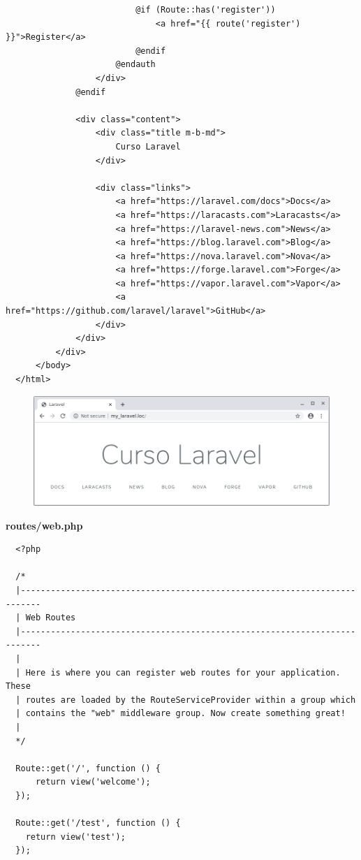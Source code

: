 \documentclass{article}
\begin{document}
\begin{verbatim}
                          @if (Route::has('register'))
                              <a href="{{ route('register') }}">Register</a>
                          @endif
                      @endauth
                  </div>
              @endif

              <div class="content">
                  <div class="title m-b-md">
                      Curso Laravel
                  </div>

                  <div class="links">
                      <a href="https://laravel.com/docs">Docs</a>
                      <a href="https://laracasts.com">Laracasts</a>
                      <a href="https://laravel-news.com">News</a>
                      <a href="https://blog.laravel.com">Blog</a>
                      <a href="https://nova.laravel.com">Nova</a>
                      <a href="https://forge.laravel.com">Forge</a>
                      <a href="https://vapor.laravel.com">Vapor</a>
                      <a href="https://github.com/laravel/laravel">GitHub</a>
                  </div>
              </div>
          </div>
      </body>
  </html>
\end{verbatim}

\begin{figure}[h!]
  \centering
  \includegraphics[scale=0.5]{./Pictures/006_vistas.png}
\end{figure}

\textbf{routes/web.php}
\begin{verbatim}
  <?php

  /*
  |--------------------------------------------------------------------------
  | Web Routes
  |--------------------------------------------------------------------------
  |
  | Here is where you can register web routes for your application. These
  | routes are loaded by the RouteServiceProvider within a group which
  | contains the "web" middleware group. Now create something great!
  |
  */

  Route::get('/', function () {
      return view('welcome');
  });

  Route::get('/test', function () {
    return view('test');
  });
\end{verbatim}
\end{document}
